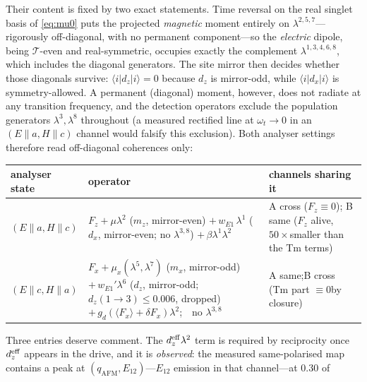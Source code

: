 \documentclass[11pt,a4paper]{article}
\newcommand{\ket}[1]{|#1\rangle}
\newcommand{\bra}[1]{\langle #1|}
\newcommand{\qafm}{q_{\mathrm{AFM}}}
\begin{document}
Their content is fixed by two exact statements.  Time reversal on the
real singlet basis of \cref{eq:mu0} puts the projected \emph{magnetic}
moment entirely on $\lambda^{2,5,7}$---rigorously off-diagonal, with no
permanent component---so the \emph{electric} dipole, being
$\mathcal T$-even and real-symmetric, occupies exactly the complement
$\lambda^{1,3,4,6,8}$, which includes the diagonal generators.  The site
mirror then decides whether those diagonals survive: $\bra id_z\ket i=0$
because $d_z$ is mirror-odd, while $\bra id_x\ket i$ is symmetry-allowed.
A permanent (diagonal) moment, however, does not radiate at any
transition frequency, and the detection operators exclude the population
generators $\lambda^{3},\lambda^8$ throughout (a measured rectified line
at $\omega_t\!\to\!0$ in an $(E\!\parallel\!a,H\!\parallel\!c)$ channel
would falsify this exclusion).  Both analyser settings therefore read
off-diagonal coherences only:
\begin{center}\small
\renewcommand{\arraystretch}{1.3}
\begin{tabular}{lll}
\toprule
analyser state & operator & channels sharing it\\
\midrule
$(E\!\parallel\!a,H\!\parallel\!c)$ &
  $F_z+\mu\lambda^2$ ($m_z$, mirror-even)\newline
  $+\,w_{E1}\,\lambda^1$ ($d_x$, mirror-even; no $\lambda^{3,8}$)\newline
  $+\,\beta\lambda^1\lambda^2$ &
  A cross ($F_z\equiv0$);\newline
  B same ($F_z$ alive, $50\times$\newline smaller than the Tm terms)\\
\midrule
$(E\!\parallel\!c,H\!\parallel\!a)$ &
  $F_x+\mu_x(\lambda^5,\lambda^7)$ ($m_x$, mirror-odd)\newline
  $+\,w_{E1}'\lambda^6$ ($d_z$, mirror-odd;
  $d_z(1\!\to\!3)\leq0.006$, dropped)\newline
  $+\,g_d(\langle F_x\rangle{+}\delta F_x)\lambda^2$;\ \ no $\lambda^{3,8}$ &
  A same;\newline B cross (Tm part $\equiv0$\newline by closure)\\
\bottomrule
\end{tabular}
\end{center}
Three entries deserve comment.  The $d_z^{\rm eff}\lambda^2$ term is
required by reciprocity once $d_z^{\rm eff}$ appears in the drive, and
it is \emph{observed}: the measured same-polarised map contains a peak
at $(\qafm,E_{12})$---$E_{12}$ emission in that channel---at $0.30$ of
\end{document}

